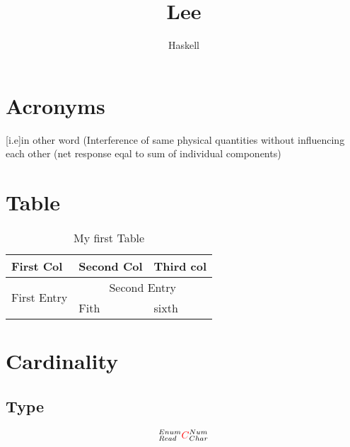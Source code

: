 \documentclass[a4paper,12pt]{article}
\author{Haskell}
\title{Lee}
\begin{document}
\maketitle
\tableofcontents
\newpage
\section{Acronyms}
\begin{acronym}
  [i.e]{in other word}
  (Interference of same physical quantities without influencing each other (net response eqal to sum of individual components)
\end{acronym}
\section{Table}\label{sec:first}
\begin{table}
  \begin{center}
    \begin{tabular}{|p{}|p{}|p{}|}
      \hline
    \textbf{First Col} & \textbf{Second Col} & \textbf{Third col} \\
    \hline
    \hline
    \multirow{2}{*}{First Entry} & \multicolumn{2}{c|}{Second Entry} \\
    & Fith & sixth \\
    \hline
  \end{tabular}
    \caption{My first Table}
    \label{tab:table}
  \end{center}
\end{table}

\section{Cardinality}\label{sec:first}
\subsection{Type}
{\Large
  \begin{equation}
    ^{Enum}_{Read}{\color{red}C}^{Num}_{Char}
  \end{equation}
}

\listoffigures
\listoftables
\end{document}

